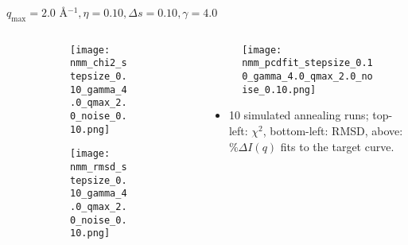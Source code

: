 \documentclass{beamer}
\begin{document}
\begin{frame}{$ q_{\textrm{max}}=2.0 $ \AA $^{-1}, \eta=0.10, \Delta s=0.10, \gamma=4.0$}
	\begin{columns}
		\begin{column}{.5\textwidth}
			\begin{figure}[H]
			\centering
			\begin{subfigure}[b]{\textwidth}
				\centering
				\texttt{[image: nmm\_chi2\_stepsize\_0.10\_gamma\_4.0\_qmax\_2.0\_noise\_0.10.png]}
				\label{fig:}
			\end{subfigure}
			\begin{subfigure}[b]{\textwidth}
				\centering
				\texttt{[image: nmm\_rmsd\_stepsize\_0.10\_gamma\_4.0\_qmax\_2.0\_noise\_0.10.png]}
				\label{fig:}
			\end{subfigure}
			\end{figure}
		\end{column}
		\begin{column}{.5\textwidth}
			\begin{figure}[H]
				\centering
				\texttt{[image: nmm\_pcdfit\_stepsize\_0.10\_gamma\_4.0\_qmax\_2.0\_noise\_0.10.png]}
				\label{fig:}
			\end{figure}
			\begin{itemize}
				\item 10 simulated annealing runs; top-left: $\chi^2$, bottom-left: RMSD, above: $\%\Delta I(q)$ fits to the target curve.
			\end{itemize}
		\end{column}
	\end{columns}
\end{frame}
 
\end{document}
